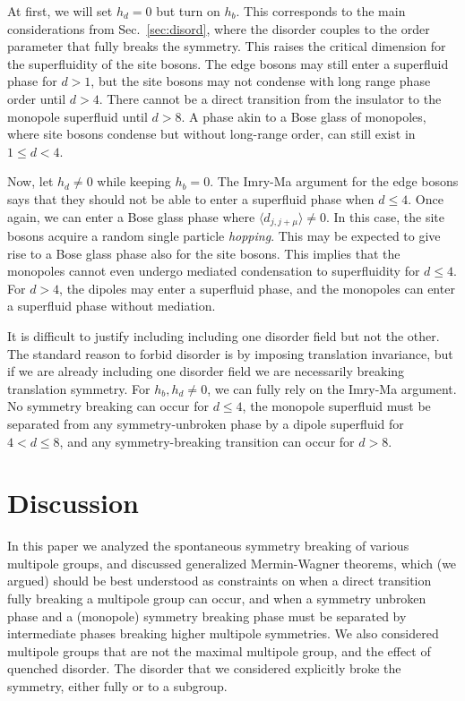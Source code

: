 \documentclass[twocolumn, longbibliography]{revtex4-2}
\begin{document}
At first, we will set $h_d=0$ but turn on $h_b$. This corresponds to the main considerations from Sec.~\ref{sec:disord}, where the disorder couples to the order parameter that fully breaks the symmetry. This raises the critical dimension for the superfluidity of the site bosons. The edge bosons may still enter a superfluid phase for $d>1$, but the site bosons may not condense with long range phase order until $d>4$. There cannot be a direct transition from the insulator to the monopole superfluid until $d>8$.  A phase akin to a Bose glass \cite{Fisheretal} of monopoles, where site bosons condense but without long-range order, can still exist in $1\le d<4$. 

Now, let $h_d\ne 0$ while keeping $h_b=0$. The Imry-Ma argument for the edge bosons says that they should not be able to enter a superfluid phase when $d\le 4$. Once again, we can enter a Bose glass phase where $\langle d_{j, j+\mu} \rangle \ne 0$. In this case, the site bosons acquire a random single particle {\it hopping}. This may be expected to give rise to a Bose glass phase also for the site bosons. This implies that the monopoles cannot even undergo mediated condensation to superfluidity for $d\le 4$. For $d>4$, the dipoles may enter a superfluid phase, and the monopoles can enter a superfluid phase without mediation.

It is difficult to justify including including one disorder field but not the other. The standard reason to forbid disorder is by imposing translation invariance, but if we are already including one disorder field we are necessarily breaking translation symmetry. For $h_b,h_d\ne 0$, we can fully rely on the Imry-Ma argument. No symmetry breaking can occur for $d\le 4$, the monopole superfluid must be separated from any symmetry-unbroken phase by a dipole superfluid for $4<d\le 8$, and any symmetry-breaking transition can occur for $d>8$. 

\section{Discussion} \label{sec:disc}

In this paper we analyzed the spontaneous symmetry breaking of various multipole groups, and discussed generalized Mermin-Wagner theorems, which (we argued) should be best understood as constraints on when a direct transition fully breaking a multipole group can occur, and when a symmetry unbroken phase and a (monopole) symmetry breaking phase must be separated by intermediate phases breaking higher multipole symmetries. We also considered multipole groups that are not the maximal multipole group, and the effect of quenched disorder. The disorder that we considered explicitly broke the symmetry, either fully or to a subgroup.
\end{document}
